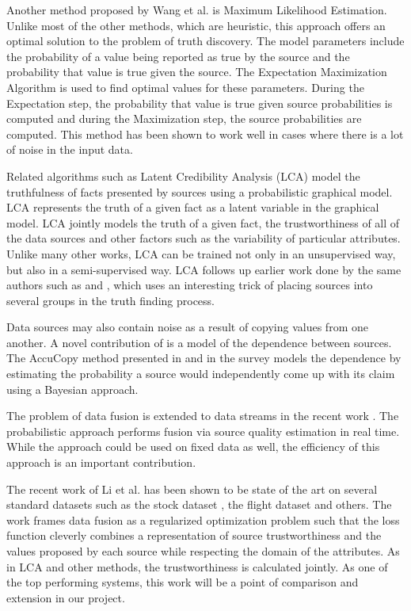 \documentclass{acm_proc_article-sp}
\begin{document}
Another method proposed by Wang et al. \cite{wang2012truth} is Maximum Likelihood Estimation. Unlike most of the other methods, which are heuristic, this approach offers an optimal solution to the problem of truth discovery. The model parameters include the probability of a value being reported as true by the source and the probability that value is true given the source. The Expectation Maximization Algorithm is used to find optimal values for these parameters. During the Expectation step, the probability that value is true given source probabilities is computed and during the Maximization step, the source probabilities are computed. This method has been shown to work well in cases where there is a lot of noise in the input data. 

Related algorithms such as Latent Credibility Analysis (LCA) \cite{pasternack:latent} model the truthfulness of facts presented by sources using a probabilistic graphical model. LCA represents the truth of a given fact as a latent variable in the graphical model. LCA jointly models the truth of a given fact, the trustworthiness of all of the data sources and other factors such as the variability of particular attributes. Unlike many other works, LCA can be trained not only in an unsupervised way, but also in a semi-supervised way. LCA follows up earlier work done by the same authors such as \cite{pasternack:knowing} and \cite{pasternack:making}, which uses an interesting trick of placing sources into several groups in the truth finding process. 


Data sources may also contain noise as a result of copying values from one another. A novel contribution of \cite{dong:integrating} is a model of the dependence between sources. The {\sc AccuCopy} method presented in \cite{dong:integrating} and in the survey \cite{li:truth} models the dependence by estimating the probability a source would independently come up with its claim using a Bayesian approach. 

The problem of data fusion is extended to data streams in the recent work \cite{zhao:truth}. The probabilistic approach performs fusion via source quality estimation in real time. While the approach could be used on fixed data as well, the efficiency of this approach is an important contribution. 

The recent work of Li et al. \cite{li:resolving} has been shown to be state of the art on several standard datasets such as the stock dataset \cite{li:truth}, the flight dataset \cite{li:truth} and others. The work frames data fusion as a regularized optimization problem such that the loss function cleverly combines a representation of source trustworthiness and the values proposed by each source while respecting the domain of the attributes. As in LCA and other methods, the trustworthiness is calculated jointly. As one of the top performing systems, this work will be a point of comparison and extension in our project. 
\end{document}
